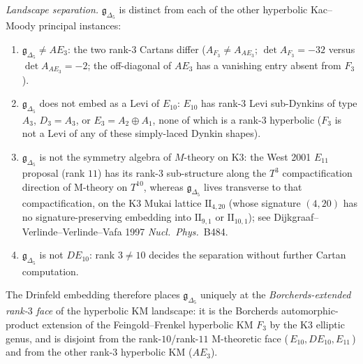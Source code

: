 \begin{theorem}
\emph{Landscape separation.} $\mathfrak{g}_{\Delta_5}$ is distinct from
each of the other hyperbolic Kac--Moody principal instances:
\begin{enumerate}[label=\textup{(\alph*)}]
\item $\mathfrak{g}_{\Delta_5} \neq AE_3$: the two rank-$3$
 Cartans differ
 ($A_{F_3} \neq A_{AE_3}$; $\det A_{F_3} = -32$ versus
 $\det A_{AE_3} = -2$; the off-diagonal of $AE_3$ has a vanishing
 entry absent from $F_3$).
\item $\mathfrak{g}_{\Delta_5}$ does not embed as a Levi of $E_{10}$:
 $E_{10}$ has rank-$3$ Levi sub-Dynkins of type $A_3$, $D_3 = A_3$,
 or $E_3 = A_2\oplus A_1$, none of which is a rank-$3$ hyperbolic
 ($F_3$ is not a Levi of any of these simply-laced Dynkin shapes).
\item $\mathfrak{g}_{\Delta_5}$ is not the symmetry algebra of
 $M$-theory on $\mathrm{K3}$: the West 2001 $E_{11}$ proposal
 (rank $11$) has its rank-$3$ sub-structure along the $T^3$
 compactification direction of M-theory on $T^{10}$, whereas
 $\mathfrak{g}_{\Delta_5}$ lives transverse to that compactification,
 on the K3 Mukai lattice $\mathrm{II}_{4,20}$ (whose signature
 $(4,20)$ has no signature-preserving embedding into
 $\mathrm{II}_{9,1}$ or $\mathrm{II}_{10,1}$); see
 Dijkgraaf--Verlinde--Verlinde--Vafa 1997 \emph{Nucl.\ Phys.}~B484.
\item $\mathfrak{g}_{\Delta_5}$ is not $DE_{10}$: rank $3 \neq 10$
 decides the separation without further Cartan computation.
\end{enumerate}

The Drinfeld embedding therefore places $\mathfrak{g}_{\Delta_5}$
uniquely at the \emph{Borcherds-extended rank-$3$ face} of the
hyperbolic KM landscape: it is the Borcherds automorphic-product
extension of the Feingold--Frenkel hyperbolic KM $F_3$ by the K3
elliptic genus, and is disjoint from the rank-$10$/rank-$11$
M-theoretic face (\,$E_{10}, DE_{10}, E_{11}$\,) and from the other
rank-$3$ hyperbolic KM ($AE_3$).
\end{theorem}

